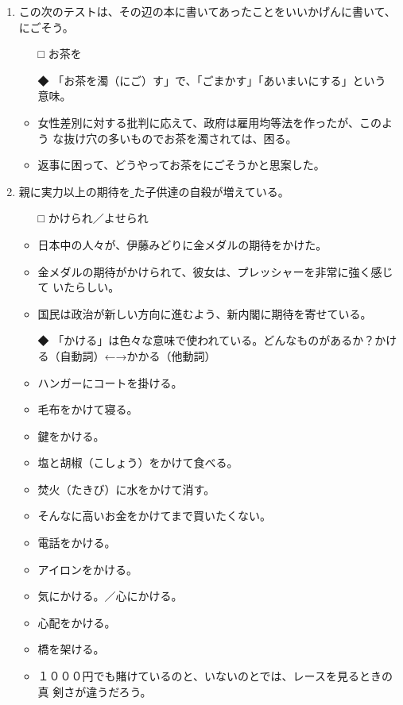 \documentclass[
uplatex,
b5paper,
10pt,
dvipdfmx
]{jsbook}
\begin{document}
\begin{enumerate}
\item この次のテストは、その辺の本に書いてあったことをいいかげんに書いて、
      \underline{   }にごそう。
\begin{itemize}
\item[□] お茶を
\item[◆] 「お茶を濁（にご）す」で、「ごまかす」「あいまいにする」という
	  意味。
\end{itemize}
\begin{itemize}
\item 女性差別に対する批判に応えて、政府は雇用均等法を作ったが、このよう
      な抜け穴の多いものでお茶を濁されては、困る。
\item 返事に困って、どうやってお茶をにごそうかと思案した。
\end{itemize}

\item 親に実力以上の期待を\underline{    }た子供達の自殺が増えている。
\begin{itemize}
\item[□] かけられ／よせられ
\end{itemize}
\begin{itemize}
\item 日本中の人々が、伊藤みどりに金メダルの期待をかけた。
\item 金メダルの期待がかけられて、彼女は、プレッシャーを非常に強く感じて
      いたらしい。
\item 国民は政治が新しい方向に進むよう、新内閣に期待を寄せている。
\end{itemize}
\begin{itemize}
\item[◆] 「かける」は色々な意味で使われている。どんなものがあるか？かけ
	  る（自動詞）←→かかる（他動詞）
\item ハンガーにコートを掛ける。
\item 毛布をかけて寝る。
\item 鍵をかける。
\item 塩と胡椒（こしょう）をかけて食べる。
\item 焚火（たきび）に水をかけて消す。
\item そんなに高いお金をかけてまで買いたくない。
\item 電話をかける。
\item アイロンをかける。
\item 気にかける。／心にかける。
\item 心配をかける。
\item 橋を架ける。
\item １０００円でも賭けているのと、いないのとでは、レースを見るときの真
      剣さが違うだろう。
\end{itemize}


\end{enumerate}
\end{document}
